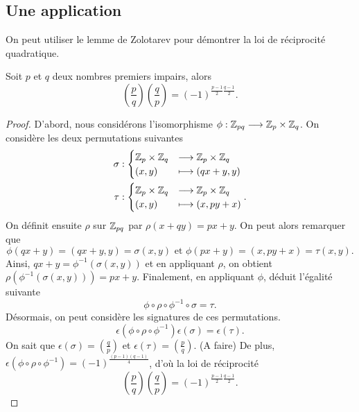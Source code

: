 \documentclass[../main.tex]{subfiles}
\begin{document}
\subsection*{Une application}
On peut utiliser le lemme de Zolotarev pour démontrer la loi de réciprocité quadratique. 
\begin{theorem} Soit \(p\) et \(q\) deux nombres premiers impairs, alors
    \begin{equation}
        \left(\frac{p}{q}\right)\left(\frac{q}{p}\right) = (-1)^{\frac{p-1}{2}\frac{q-1}{2}}.
    \end{equation}
\end{theorem}
\begin{proof} D'abord, nous considérons l'isomorphisme \(\phi : \mathbb{Z}_{pq}\longrightarrow \mathbb{Z}_p \times \mathbb{Z}_q\).
    On considère les deux permutations suivantes 
    \begin{align}
        \sigma &: \begin{cases}
            \mathbb{Z}_p \times \mathbb{Z}_q & \longrightarrow \mathbb{Z}_p \times \mathbb{Z}_q\\
            (x,y) & \longmapsto (qx + y,y)
        \end{cases}\\
        \tau &: \begin{cases}
            \mathbb{Z}_p \times \mathbb{Z}_q & \longrightarrow \mathbb{Z}_p \times \mathbb{Z}_q\\
            (x,y) & \longmapsto (x,py + x)
        \end{cases}.
    \end{align}
    On définit ensuite \(\rho\) sur \(\mathbb{Z}_{pq}\) par \(\rho(x+qy) = px+y\). On peut alors remarquer que
    \begin{equation}
        \phi(qx+y) = (qx+y,y) = \sigma(x,y) \text{ et } \phi(px+y) = (x,py+x) = \tau(x,y).
    \end{equation}
    Ainsi, \(qx+y = \phi^{-1}(\sigma(x,y))\) et en appliquant \(\rho\), on obtient 
    \(\rho(\phi^{-1}(\sigma(x,y))) = px+y\). Finalement, en appliquant \(\phi\), déduit l'égalité suivante
    \begin{equation}
        \phi\circ \rho \circ \phi^{-1} \circ \sigma = \tau.
    \end{equation}
    Désormais, on peut considère les signatures de ces permutations.
    \begin{equation}
        \epsilon(\phi\circ \rho \circ \phi^{-1})\epsilon(\sigma) = \epsilon(\tau).
    \end{equation}
    On sait que \(\epsilon(\sigma) = \left(\frac{q}{p}\right)\) et \(\epsilon(\tau) = \left(\frac{p}{q}\right)\).
    (A faire) De plus, \(\epsilon(\phi\circ \rho \circ \phi^{-1}) = (-1)^{\frac{(p-1)(q-1)}{4}}\), d'où la loi de réciprocité 
    \begin{equation}
        \left(\frac{p}{q}\right)\left(\frac{q}{p}\right) = (-1)^{\frac{p-1}{2}\frac{q-1}{2}}.
    \end{equation}
\end{proof}
\end{document}
